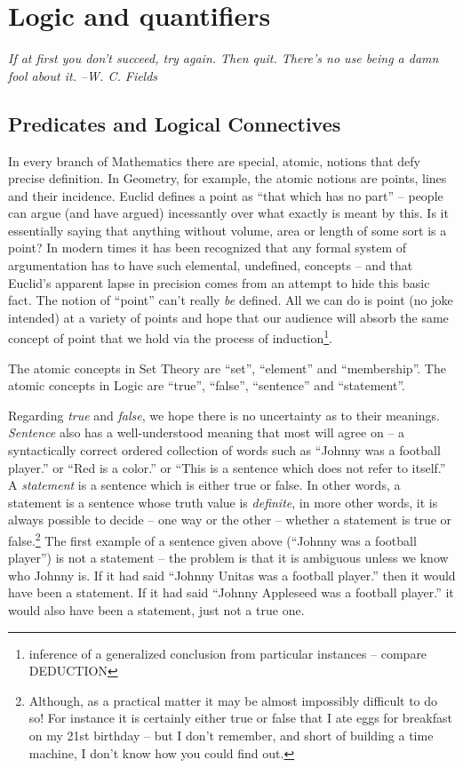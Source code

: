 
\chapter{Logic and quantifiers}
\label{ch:logic}

{\em If at first you don't succeed, try again. Then quit. There's no use being a damn fool about it. --W. C. Fields}

\section{Predicates and Logical Connectives}
\label{sec:pred}

In every branch of Mathematics there are special, 
atomic, notions that
defy precise definition.  In Geometry, for example, the atomic notions
are points, lines and their incidence.  Euclid defines a point as
``that which has no part'' -- people can argue (and have argued) incessantly
over what exactly is meant by this.  Is it essentially saying that anything 
without volume, area or length of some sort is a point?  In modern times
it has been recognized that any formal system of argumentation has to
have such elemental, undefined, concepts -- and that Euclid's apparent
lapse in precision comes from an attempt to hide this basic fact.
The notion of ``point'' can't really {\em be} defined.  All we can do
is point (no joke intended) at a variety of points and hope that our
audience will absorb the same concept of point that we hold via the 
process of induction\footnote{inference of a %
generalized conclusion from particular instances -- compare DEDUCTION}.

The atomic concepts in Set Theory are ``set'', ``element'' and ``membership''.
The atomic concepts in Logic are ``true'', ``false'',  
``sentence'' and  ``statement''.  

Regarding {\em true} and {\em false}, we hope there is no uncertainty
as to their meanings.  {\em Sentence} also has a well-understood
meaning that most will agree on -- a syntactically correct ordered collection
of words such as ``Johnny was a football player.'' or ``Red is a color.''
or ``This is a sentence which does not refer to itself.''  A {\em statement}
is a sentence which is either true or false.  
In other words, a statement
is a sentence whose truth value is {\em definite}, in more other words,
it is always possible to decide -- one way or the other -- whether
a statement is true or false.\footnote{Although, as a practical matter
it may be almost impossibly difficult to do so!  For instance it is 
certainly either true or false that I ate eggs for breakfast on my 21st
birthday -- but I don't remember, and short of building a time machine,
I don't know how you could find out.}   The first example
of a sentence given above (``Johnny was a football player'') is not a 
statement -- the problem is that it is ambiguous unless we know who
Johnny is.  If it had said ``Johnny Unitas was a football player.'' then
it would have been a statement.  If it had said ``Johnny Appleseed was a 
football player.'' it would also have been a statement, just not a true one.

